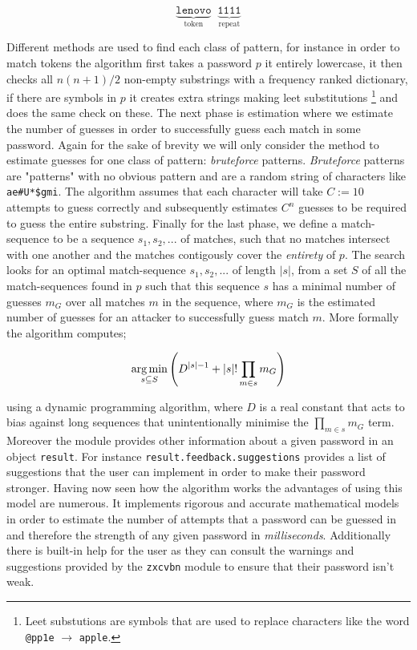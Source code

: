 \[
  \underbrace{ \mathtt{lenovo} }_\text{token} \; \;
  \underbrace{ \mathtt{1111} }_\text{repeat}
\]

Different methods are used to find each class of pattern, for 
instance in order to match tokens the algorithm first takes
a password $p$ it entirely lowercase, it then checks all 
$n(n+1)/2$ non-empty substrings with a frequency ranked
dictionary, if there are symbols in $p$ it creates extra 
strings making leet substitutions \footnote{Leet substutions are symbols that are used to replace characters like the word
\texttt{@pp1e} $\rightarrow$ \texttt{apple}.}
and does the same check on these. The next phase is
estimation where we estimate the number of guesses in order
to successfully guess each match in some password. Again
for the sake of brevity we will only consider the method to 
estimate guesses for one class of pattern: \textit{bruteforce}
patterns. \textit{Bruteforce} patterns are "patterns" with no
obvious pattern and are a random string of characters like
\texttt{ae\#U*\$gmi}. The algorithm assumes that each
character will take $C := 10$ attempts to guess correctly and 
subsequently estimates $C^n$ guesses to be required to guess
the entire substring. Finally for the last phase, we define a
match-sequence to be a sequence $s_1, s_2, ...$ of matches, 
such that no matches intersect with one another and the
matches contigously cover the \textit{entirety} of $p$. 
The search looks
for an optimal match-sequence $s_1, s_2, ...$ of length
$\left|s\right|$, from a set $S$ of all the match-sequences
found in $p$ such that this sequence $s$ has a minimal number
of guesses $m_G$ over all matches $m$ in the sequence, where 
$m_G$ is the estimated number of guesses for an attacker to 
successfully guess match $m$. More formally the algorithm 
computes;

\[
  \operatorname*{arg\,min}_{s \subseteq S} \left( D^{\left|s\right| -1} + 
  \left|s\right|! \prod_{m \in s} m_G \right)
\]

using a dynamic programming algorithm,
where $D$ is a real constant that acts to bias against long
sequences that unintentionally minimise the 
$\prod_{m \in s} m_G$ term. Moreover the module provides other
information about a given password in an object 
\texttt{result}. For instance 
\texttt{result.feedback.suggestions} provides a list of 
suggestions that the user can implement in order to make their
password stronger. Having now seen how the algorithm works
the advantages of using this model are numerous. It implements
rigorous and accurate mathematical models in order to estimate
the number of attempts that a password can be guessed in and 
therefore the strength of any given password in 
\emph{milliseconds}. Additionally there is built-in help for 
the user as they can consult the warnings and suggestions 
provided by the \texttt{zxcvbn} module to ensure that their
password isn't weak.
\vspace{0.2cm}

